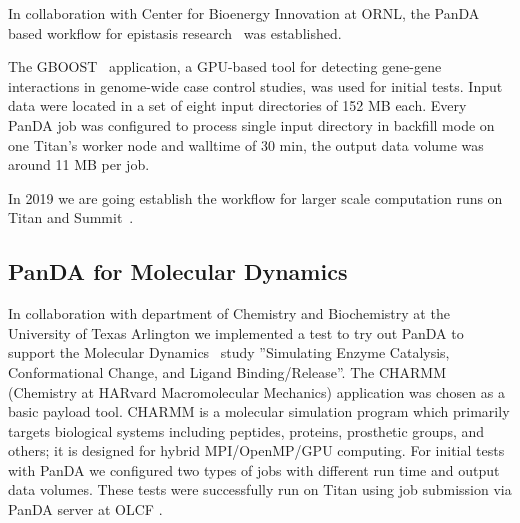 \documentclass{webofc}
\begin{document}
In collaboration with Center for Bioenergy Innovation at ORNL, the PanDA based workflow for epistasis research~\cite{Gros277} was established.


The GBOOST~\cite{GBOOST} application, a GPU-based tool for detecting gene-gene interactions in genome-wide case control studies, was used for initial tests. Input data were located in a set of eight input directories of 152 MB each. 
Every PanDA job was configured to process single input directory in backfill mode on one Titan's worker node and walltime of 30 min, the output data volume was around 11 MB per job.

In 2019 we are going establish the workflow for larger scale computation runs on Titan and Summit~\cite{Summit}.

\subsection{PanDA for Molecular Dynamics} \label{section_moldyn}

In collaboration with department of Chemistry and Biochemistry at the University of Texas Arlington we implemented a test to try out PanDA to support the Molecular Dynamics~\cite{3b6dad414e794d36954333f8f177f47c} study ''Simulating Enzyme Catalysis, Conformational Change, and Ligand Binding/Release''. 
The CHARMM (Chemistry at HARvard Macromolecular Mechanics) application was chosen as a basic payload tool. 
CHARMM is a molecular simulation program which primarily targets biological systems including peptides, proteins, prosthetic groups, and others; it is designed for hybrid MPI/OpenMP/GPU computing.
For initial tests with PanDA we configured two types of jobs with different run time and output data volumes. 
These tests were successfully run on Titan using job submission via PanDA server at OLCF .
\end{document}
